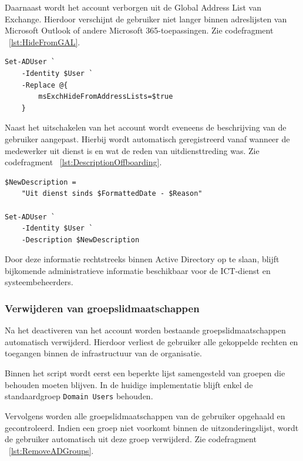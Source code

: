 Daarnaast wordt het account verborgen uit de Global Address List van Exchange. Hierdoor verschijnt de gebruiker niet langer binnen adreslijsten van Microsoft Outlook of andere Microsoft 365-toepassingen. Zie codefragment ~\ref{lst:HideFromGAL}.

\begin{listing}[ht]
\begin{verbatim}
Set-ADUser `
    -Identity $User `
    -Replace @{
        msExchHideFromAddressLists=$true
    }
\end{verbatim}
\caption{Verbergen uit de Global Address List}
\label{lst:HideFromGAL}
\end{listing}

Naast het uitschakelen van het account wordt eveneens de beschrijving van de gebruiker aangepast. Hierbij wordt automatisch geregistreerd vanaf wanneer de medewerker uit dienst is en wat de reden van uitdiensttreding was. Zie codefragment ~\ref{lst:DescriptionOffboarding}.

\begin{listing}[ht]
\begin{verbatim}
$NewDescription =
    "Uit dienst sinds $FormattedDate - $Reason"

Set-ADUser `
    -Identity $User `
    -Description $NewDescription
\end{verbatim}
\caption{Aanpassen van de beschrijving}
\label{lst:DescriptionOffboarding}
\end{listing}

Door deze informatie rechtstreeks binnen Active Directory op te slaan, blijft bijkomende administratieve informatie beschikbaar voor de ICT-dienst en systeembeheerders.

\subsubsection{Verwijderen van groepslidmaatschappen}

Na het deactiveren van het account worden bestaande groepslidmaatschappen automatisch verwijderd. Hierdoor verliest de gebruiker alle gekoppelde rechten en toegangen binnen de infrastructuur van de organisatie.

Binnen het script wordt eerst een beperkte lijst samengesteld van groepen die behouden moeten blijven. In de huidige implementatie blijft enkel de standaardgroep \texttt{Domain Users} behouden.

Vervolgens worden alle groepslidmaatschappen van de gebruiker opgehaald en gecontroleerd. Indien een groep niet voorkomt binnen de uitzonderingslijst, wordt de gebruiker automatisch uit deze groep verwijderd. Zie codefragment ~\ref{lst:RemoveADGroups}.


